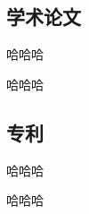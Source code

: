 \documentclass{cqupt_thesis}
\begin{document}
    \begin{mastermainwork}
        \subsection*{学术论文}
        \begin{achievements}
            \item 哈哈哈
            \item 哈哈哈
        \end{achievements}
        \subsection*{专利}
        \begin{achievements}
            \item 哈哈哈
            \item 哈哈哈
        \end{achievements}
    \end{mastermainwork}
\end{document}
